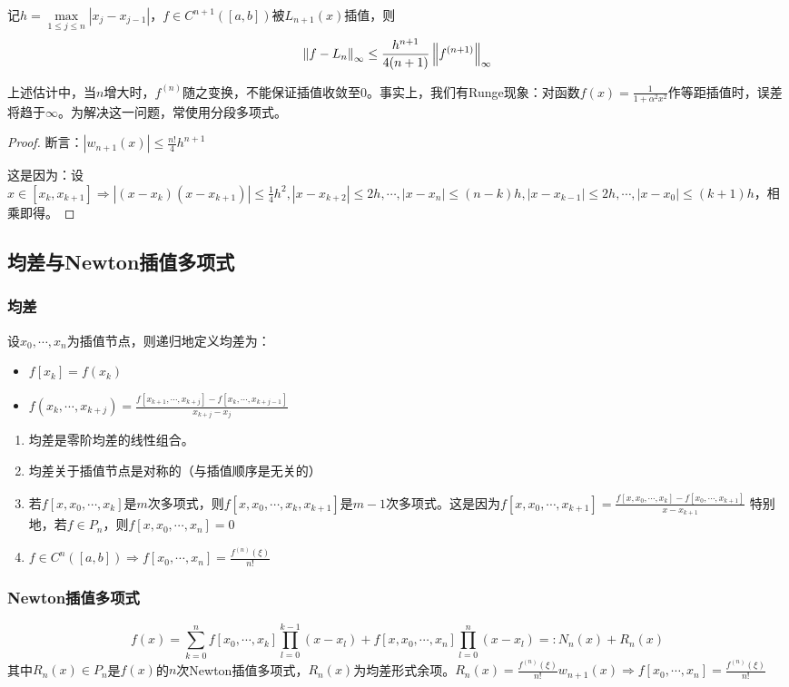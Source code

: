 \documentclass{ctexart}
\begin{document}
\begin{Cor}
记$h=\max\limits_{1\leq j\leq n}|x_j-x_{j-1}|$，$f\in C^{n+1}([a,b])$被$L_{n+1}(x)$插值，则
\[\left\|f-L_n \right\|_\infty\leq \frac{h^{n+1}}{4(n+1)}\left\|f^{(n+1)} \right\|_\infty\]
\end{Cor}
上述估计中，当$n$增大时，$f^{(n)}$随之变换，不能保证插值收敛至$0$。事实上，我们有Runge现象：对函数$f(x)=\frac{1}{1+\alpha^2x^2}$作等距插值时，误差将趋于$\infty$。为解决这一问题，常使用分段多项式。
\begin{proof}
断言：$|w_{n+1}(x)|\leq \frac{n!}{4}h^{n+1}$

这是因为：设$x\in[x_k,x_{k+1}]\Rightarrow |(x-x_k)(x-x_{k+1})|\leq \frac{1}{4}h^2,|x-x_{k+2}|\leq 2h,\cdots, |x-x_n|\leq (n-k)h,|x-x_{k-1}|\leq 2h,\cdots,|x-x_0|\leq (k+1)h$，相乘即得。
\end{proof}

\subsection{均差与Newton插值多项式}
\subsubsection{均差}
\begin{Def}
设$x_0,\cdots,x_n$为插值节点，则递归地定义均差为：
\begin{itemize}
\item $f[x_k]=f(x_k)$
\item $f(x_k,\cdots,x_{k+j})=\frac{f[x_{k+1},\cdots, x_{k+j}]-f[x_k,\cdots,x_{k+j-1}]}{x_{k+j}-x_j}$
\end{itemize}
\end{Def}

\begin{Prop}
\begin{enumerate}
\item 均差是零阶均差的线性组合。
\item 均差关于插值节点是对称的（与插值顺序是无关的）
\item 若$f[x,x_0,\cdots,x_k]$是$m$次多项式，则$f[x,x_0,\cdots, x_k,x_{k+1}]$是$m-1$次多项式。这是因为$f[x,x_0,\cdots,x_{k+1}]=\frac{f[x,x_0,\cdots,x_k]-f[x_0,\cdots,x_{k+1}]}{x-x_{k+1}}$ 特别地，若$f\in P_n$，则$f[x,x_0,\cdots,x_n]=0$
\item $f\in C^n([a,b])\Rightarrow f[x_0,\cdots,x_n]=\frac{f^{(n)}(\xi)}{n!}$
\end{enumerate}
\end{Prop}

\subsubsection{Newton插值多项式}
\[f(x)=\sum_{k=0}^n f[x_0,\cdots,x_k]\prod_{l=0}^{k-1} (x-x_l)+f[x,x_0,\cdots,x_n]\prod_{l=0}^n (x-x_l)=:N_n(x)+R_n(x)\]
其中$R_n(x)\in P_n$是$f(x)$的$n$次Newton插值多项式，$R_n(x)$为均差形式余项。$R_n(x)=\frac{f^{(n)}(\xi)}{n!}w_{n+1}(x)\Rightarrow f[x_0,\cdots,x_n]=\frac{f^{(n)}(\xi)}{n!}$
\end{document}
